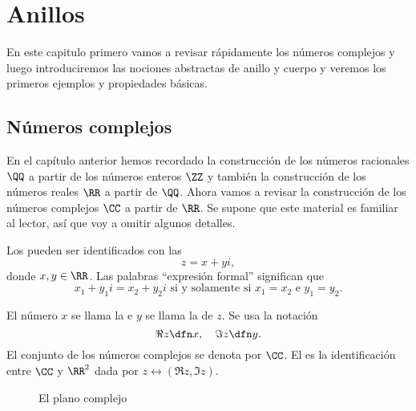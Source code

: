 \chapter{Anillos}
\label{cap:anillos}

\ifdefined\separatechapter\bookbanner\fi

En este capitulo primero vamos a revisar rápidamente los números complejos y
luego introduciremos las nociones abstractas de anillo y cuerpo y veremos los
primeros ejemplos y propiedades básicas.


\section{Números complejos}

En el capítulo anterior hemos recordado la construcción de los números
racionales $\QQ$ a partir de los números enteros $\ZZ$ y también la construcción
de los números reales $\RR$ a partir de $\QQ$. Ahora vamos a revisar la
construcción de los números complejos $\CC$ a partir de $\RR$. Se supone que
este material es familiar al lector, así que voy a omitir algunos detalles.

\vspace{1em}

Los  pueden ser identificados con las
$$z = x + yi,$$
donde $x,y\in \RR$. Las palabras ``expresión formal'' significan que
$$x_1 + y_1 i = x_2 + y_2 i \text{ si y solamente si }x_1 = x_2\text{ e }y_1 = y_2.$$

El número $x$ se llama la  e $y$ se llama la
 de $z$. Se usa la notación
$$\Re z \dfn x, \quad \Im z \dfn y.$$
El conjunto de los números complejos se denota por $\CC$.
El  es la identificación entre $\CC$ y $\RR^2$ dada por
$z \leftrightarrow (\Re z, \Im z)$.

\begin{figure}[h]
  \begin{center}
  \end{center}
  \caption{El plano complejo}
\end{figure}

